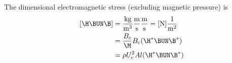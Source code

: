 \documentclass[11pt]{article}
\begin{document}
\doublespacing
\MOONSTITLE
\maketitle

The dimensional electromagnetic stress (excluding magnetic pressure) is
\begin{equation}\begin{aligned}
[\H \BUN \B] & = \frac{\text{kg}}{\text{m}^3} \frac{\text{m}}{\text{s}} \frac{\text{m}}{\text{s}} = [\text{N}] \frac{1}{\text{m}^2} \\
             & = \frac{B_c}{\M} B_c (\H^* \BUN \B^*) \\
             & = \rho U_c^2 Al (\H^* \BUN \B^*) \\
\end{aligned}\end{equation}
\end{document}
